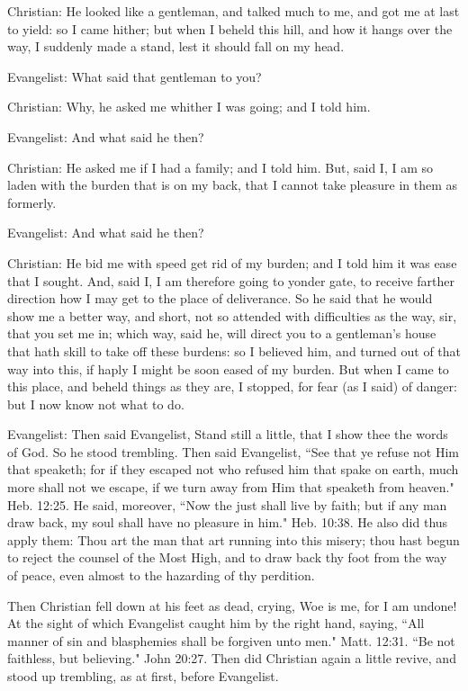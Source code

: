 Christian: He looked like a gentleman, and talked much to me, and got me at last to yield: so I came hither; but when I beheld this hill, and how it hangs over the way, I suddenly made a stand, lest it should fall on my head. 

Evangelist: What said that gentleman to you? 

Christian: Why, he asked me whither I was going; and I told him. 

Evangelist: And what said he then? 

Christian: He asked me if I had a family; and I told him. But, said I, I am so laden with the burden that is on my back, that I cannot take pleasure in them as formerly. 

Evangelist: And what said he then? 

Christian: He bid me with speed get rid of my burden; and I told him it was ease that I sought. And, said I, I am therefore going to yonder gate, to receive farther direction how I may get to the place of deliverance. So he said that he would show me a better way, and short, not so attended with difficulties as the way, sir, that you set me in; which way, said he, will direct you to a gentleman's house that hath skill to take off these burdens: so I believed him, and turned out of that way into this, if haply I might be soon eased of my burden. But when I came to this place, and beheld things as they are, I stopped, for fear (as I said) of danger: but I now know not what to do. 

Evangelist: Then said Evangelist, Stand still a little, that I show thee the words of God. So he stood trembling. Then said Evangelist, ``See that ye refuse not Him that speaketh; for if they escaped not who refused him that spake on earth, much more shall not we escape, if we turn away from Him that speaketh from heaven." Heb. 12:25. He said, moreover, ``Now the just shall live by faith; but if any man draw back, my soul shall have no pleasure in him." Heb. 10:38. He also did thus apply them: Thou art the man that art running into this misery; thou hast begun to reject the counsel of the Most High, and to draw back thy foot from the way of peace, even almost to the hazarding of thy perdition. 

Then Christian fell down at his feet as dead, crying, Woe is me, for I am undone! At the sight of which Evangelist caught him by the right hand, saying, ``All manner of sin and blasphemies shall be forgiven unto men." Matt. 12:31. ``Be not faithless, but believing." John 20:27. Then did Christian again a little revive, and stood up trembling, as at first, before Evangelist. 

